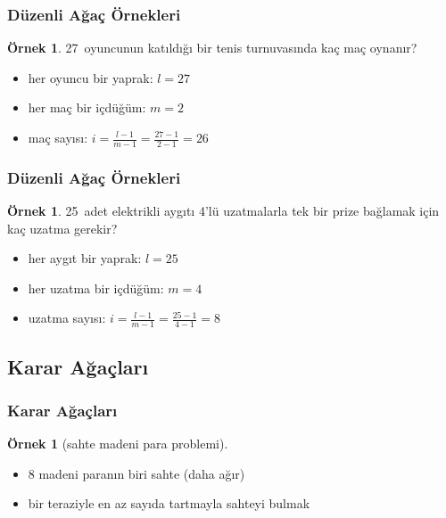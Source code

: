 \documentclass[dvipsnames]{beamer}
\theoremstyle{definition}
\theoremstyle{example}
\newtheorem{ornek}[theorem]{Örnek}
\theoremstyle{plain}
\begin{document}
\begin{frame}
  \frametitle{Düzenli Ağaç Örnekleri}

  \begin{ornek}
    27~oyuncunun katıldığı bir tenis turnuvasında kaç maç oynanır?

    \pause
    \bigskip
    \begin{itemize}
      \item her oyuncu bir yaprak: $l = 27$
      \item her maç bir içdüğüm: $m = 2$

      \pause
      \item maç sayısı: $i = \frac{l - 1}{m - 1} = \frac{27 - 1}{2 - 1} = 26$
    \end{itemize}
  \end{ornek}
\end{frame}

\begin{frame}
  \frametitle{Düzenli Ağaç Örnekleri}

  \begin{ornek}
    25~adet elektrikli aygıtı 4'lü uzatmalarla tek bir prize bağlamak için\\
    kaç uzatma gerekir?

    \pause
    \bigskip
    \begin{itemize}
      \item her aygıt bir yaprak: $l = 25$
      \item her uzatma bir içdüğüm: $m = 4$

      \pause
      \item uzatma sayısı: $i = \frac{l - 1}{m - 1} = \frac{25 - 1}{4 - 1} = 8$
    \end{itemize}
  \end{ornek}
\end{frame}

\subsection{Karar Ağaçları}

\begin{frame}
  \frametitle{Karar Ağaçları}

  \begin{ornek}[sahte madeni para problemi]
    \begin{itemize}
      \item 8 madeni paranın biri sahte (daha ağır)
      \item bir teraziyle en az sayıda tartmayla sahteyi bulmak
    \end{itemize}
  \end{ornek}
\end{frame}
\end{document}
